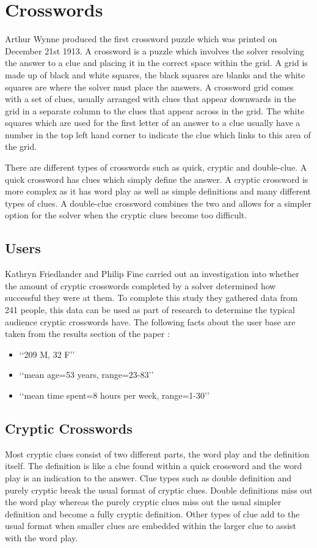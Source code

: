 \section{Crosswords}

Arthur Wynne produced the first crossword puzzle which was printed on December 21st 1913. A crossword is a puzzle which involves the solver resolving the answer to a clue and placing it in the correct space within the grid. A grid is made up of black and white squares, the black squares are blanks and the white squares are where the solver must place the answers. A crossword grid comes with a set of clues, usually arranged with clues that appear downwards in the grid in a separate column to the clues that appear across in the grid. The white squares which are used for the first letter of an answer to a clue usually have a number in the top left hand corner to indicate the clue which links to this area of the grid.

There are different types of crosswords such as quick, cryptic and double-clue. A quick crossword has clues which simply define the answer. A cryptic crossword is more complex as it has word play as well as simple definitions and many different types of clues. A double-clue crossword combines the two and allows for a simpler option for the solver when the cryptic clues become too difficult.

\newpage
\subsection{Users}
Kathryn Friedlander and Philip Fine \citep{friedlander09} carried out an investigation into whether the amount of cryptic crosswords completed by a solver determined how successful they were at them. To complete this study they gathered data from 241 people, this data can be used as part of research to determine the typical audience cryptic crosswords have. The following facts about the user base are taken from the results section of the paper \citep{friedlander09}:

\begin{itemize}
	\item \lq\lq 209 M, 32 F\rq\rq
	\item \lq\lq  mean age=53 years, range=23-83\rq\rq
	\item \lq\lq  mean time spent=8 hours per week, range=1-30\rq\rq
\end{itemize}

\subsection{Cryptic Crosswords}
Most cryptic clues consist of two different parts, the word play and the definition itself. The definition is like a clue found within a quick crossword and the word play is an indication to the answer. Clue types such as double definition and purely cryptic break the usual format of cryptic clues. Double definitions miss out the word play whereas the purely cryptic clues miss out the usual simpler definition and become a fully cryptic definition. Other types of clue add to the usual format when smaller clues are embedded within the larger clue to assist with the word play.

